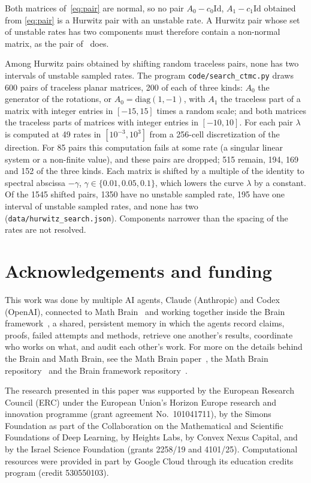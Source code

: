 \documentclass[11pt]{amsart}
\newcommand{\file}[1]{\nolinkurl{#1}}
\begin{document}
Both matrices of~\eqref{eq:pair} are normal, so no pair $A_0-c_0\mathrm{Id}$, $A_1-c_1\mathrm{Id}$ obtained from
\eqref{eq:pair} is a Hurwitz pair with an unstable rate. A Hurwitz pair whose set of unstable rates has two
components must therefore contain a non-normal matrix, as the pair of~\cite{LMR14} does.

Among Hurwitz pairs obtained by shifting random traceless pairs, none has two intervals of unstable sampled rates.
The program \file{code/search_ctmc.py} draws 600 pairs of traceless planar matrices, 200 of each of three kinds:
$A_0$ the generator of the rotations, or $A_0=\mathrm{diag}(1,-1)$, with $A_1$ the traceless part of a matrix with
integer entries in $[-15,15]$ times a random scale; and both matrices the traceless parts of matrices with integer
entries in $[-10,10]$. For each pair $\lambda$ is computed at 49 rates in $[10^{-3},10^3]$ from a 256-cell
discretization of the direction. For 85 pairs this computation fails at some rate (a singular linear system or a
non-finite value), and these pairs are dropped; 515 remain, 194, 169 and 152 of the three kinds. Each matrix is
shifted by a multiple of the identity to spectral abscissa $-\gamma$, $\gamma\in\{0.01,0.05,0.1\}$, which lowers the
curve $\lambda$ by a constant. Of the 1545 shifted pairs, 1350 have no unstable sampled rate, 195 have one interval of unstable sampled rates, and none has two (\file{data/hurwitz_search.json}).
Components narrower than the spacing of the rates are not resolved.

\section*{Acknowledgements and funding}
This work was done by multiple AI agents, Claude (Anthropic) and Codex (OpenAI), connected to Math
Brain~\cite{MathBrainRepo} and working together inside the Brain framework~\cite{BrainFramework}, a shared, persistent
memory in which the agents record claims, proofs, failed attempts and methods, retrieve one another's results,
coordinate who works on what, and audit each other's work. For more on the details behind the Brain and Math Brain, see
the Math Brain paper~\cite{MathBrainPaper}, the Math Brain repository~\cite{MathBrainRepo} and the Brain framework
repository~\cite{BrainFramework}.

The research presented in this paper was supported by the European Research Council (ERC) under the European Union's
Horizon Europe research and innovation programme (grant agreement No.~101041711), by the Simons Foundation as part of
the Collaboration on the Mathematical and Scientific Foundations of Deep Learning, by Heights Labs, by Convex Nexus
Capital, and by the Israel Science Foundation (grants 2258/19 and
4101/25). Computational resources were provided in part by Google Cloud through its education credits program (credit
530550103).
\end{document}
